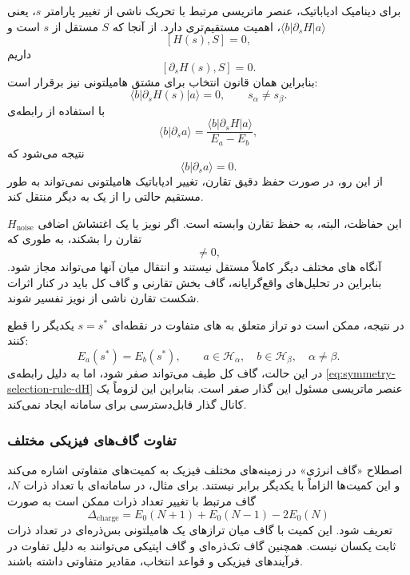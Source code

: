 برای دینامیک ادیاباتیک، عنصر ماتریسی مرتبط با تحریک ناشی از تغییر
پارامتر $s$، یعنی
$\langle b|\partial_s H|a\rangle$، اهمیت مستقیم‌تری دارد. از آنجا که
$S$ مستقل از $s$ است و
\[[H(s),S]=0,\]
داریم
\[[\partial_s H(s),S]=0.\]
بنابراین همان قانون انتخاب برای مشتق هامیلتونی نیز برقرار است:
\begin{equation}
	\langle b|\partial_s H(s)|a\rangle=0,
	\qquad
	s_{\alpha}\neq s_{\beta}.
	\label{eq:symmetry-selection-rule-dH}
\end{equation}
با استفاده از رابطه‌ی
\[\langle b|\partial_s a\rangle
=
\frac{
	\langle b|\partial_sH|a\rangle
}{
	E_a-E_b},\]
نتیجه می‌شود که
\begin{equation}
	\langle b|\partial_s a\rangle=0.
	\label{eq:symmetry-no-transition}
\end{equation}
از این رو، در صورت حفظ دقیق تقارن، تغییر ادیاباتیک هامیلتونی نمی‌تواند
به طور مستقیم حالتی را از یک  به  دیگر منتقل کند.


این حفاظت، البته، به حفظ تقارن وابسته است. اگر نویز یا یک اغتشاش
اضافی $H_{\mathrm{noise}}$ تقارن را بشکند، به طوری که
\begin{equation}
	[H_{\mathrm{noise}},S]\neq0,
\end{equation}
آنگاه  های مختلف دیگر کاملاً مستقل نیستند و انتقال میان آنها می‌تواند مجاز شود. بنابراین در تحلیل‌های واقع‌گرایانه، گاف بخش
تقارنی و گاف کل باید در کنار اثرات شکست تقارن ناشی از نویز تفسیر
شوند.

در نتیجه، ممکن است دو تراز متعلق به  های متفاوت در نقطه‌ای
$s=s^\ast$ یکدیگر را قطع کنند:
\begin{equation}
	E_a(s^\ast)=E_b(s^\ast),
	\qquad
	a\in\mathcal H_{\alpha},
	\quad
	b\in\mathcal H_{\beta},
	\quad
	\alpha\neq\beta.
\end{equation}
در این حالت، گاف کل طیف می‌تواند صفر شود، اما به دلیل رابطه‌ی
\eqref{eq:symmetry-selection-rule-dH} عنصر ماتریسی مسئول این گذار
صفر است. بنابراین این  لزوماً یک کانال گذار قابل‌دسترسی
برای سامانه ایجاد نمی‌کند.

\subsubsection{تفاوت گاف‌های فیزیکی مختلف}

اصطلاح «گاف انرژی» در زمینه‌های مختلف فیزیک به کمیت‌های متفاوتی
اشاره می‌کند و این کمیت‌ها الزاماً با یکدیگر برابر نیستند. برای
مثال، در سامانه‌ای با تعداد ذرات $N$، گاف مرتبط با تغییر تعداد ذرات
ممکن است به صورت
\begin{equation}
	\Delta_{\mathrm{charge}}
	=
	E_0(N+1)+E_0(N-1)-2E_0(N)
	\label{eq:charge-gap}
\end{equation}
تعریف شود. این کمیت با گاف میان ترازهای یک هامیلتونی بس‌ذره‌ای در
تعداد ذرات ثابت یکسان نیست. همچنین گاف تک‌ذره‌ای و گاف اپتیکی
می‌توانند به دلیل تفاوت در فرآیندهای فیزیکی و قواعد انتخاب، مقادیر
متفاوتی داشته باشند.

